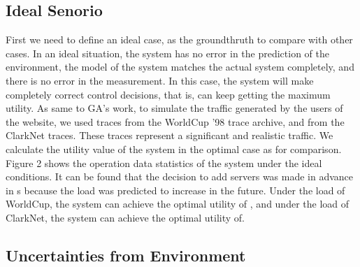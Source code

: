\documentclass[sigconf]{acmart}
\begin{document}
\subsection{Ideal Senorio}
First we need to define an ideal case, as the groundthruth to compare with other cases.
In an ideal situation, the system has no error in the prediction of the environment, the model of the system matches the actual system completely, and there is no error in the measurement. In this case, the system will make completely correct control decisions, that is, can keep getting the maximum utility.
As same to GA's work, to simulate the traffic generated by the users of the website, we used traces from the WorldCup ’98 trace archive\cite{worldcup}, and from the ClarkNet traces\cite{clarknet}. These traces represent a significant and realistic traffic\cite{traces}. We calculate the utility value of the system in the optimal case as for comparison.
Figure 2 shows the operation data statistics of the system under the ideal conditions. It can be found that the decision to add servers was made in advance in s because the load was predicted to increase in the future.
Under the load of WorldCup, the system can achieve the optimal utility of , and under the load of ClarkNet, the system can achieve the optimal utility of.
\subsection{Uncertainties from Environment}
\end{document}
